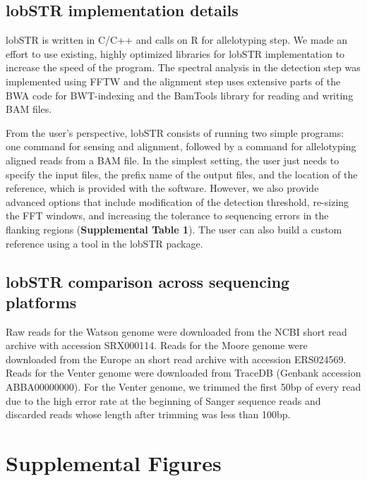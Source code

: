\subsection{lobSTR implementation details}
lobSTR is written in C/C++ and calls on R for allelotyping step. We made an effort to use existing, highly optimized libraries for lobSTR implementation to increase the speed of the program. The spectral analysis in the detection step was implemented using FFTW \cite{FrigoJohnson1998} and the alignment step uses extensive parts of the BWA code \cite{LiDurbin2009a} for BWT-indexing and the BamTools library \cite{BarnettGarrisonQuinlanEtAl2011} for reading and writing BAM files. 

From the user's perspective, lobSTR consists of running two simple programs: one command for sensing and alignment, followed by a command for allelotyping aligned reads from a BAM file. In the simplest setting, the user just needs to specify the input files, the prefix name of the output files, and the location of the reference, which is provided with the software. However, we also provide advanced options that include modification of the detection threshold, re-sizing the FFT windows, and increasing the tolerance to sequencing errors in the flanking regions (\textbf{Supplemental Table 1}). The user can also build a custom reference using a tool in the lobSTR package.

\subsection{lobSTR comparison across sequencing platforms}
Raw reads for the Watson genome were downloaded from the NCBI short read archive with accession SRX000114. Reads for the Moore genome were downloaded from the Europe	an short read archive with accession ERS024569. Reads for the Venter genome were downloaded from TraceDB (Genbank accession ABBA00000000). For the Venter genome, we trimmed the first 50bp of every read due to the high error rate at the beginning of Sanger sequence reads and discarded reads whose length after trimming was less than 100bp.

\pagebreak
\section{Supplemental Figures}

